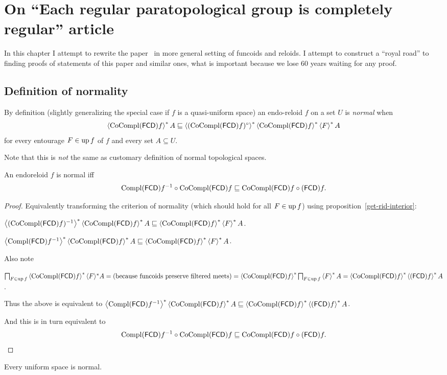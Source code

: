 \chapter{On ``Each regular paratopological group is completely regular'' article}

In this chapter I attempt to rewrite the paper~\cite{2014arXiv1410.1504B} in more general setting of funcoids and reloids.
I attempt to construct a ``royal road'' to finding proofs of statements of this paper and similar ones, what is
important because we lose 60 years waiting for any proof.

\section{Definition of normality}


By definition (slightly generalizing the special case if $f$ is a
quasi-uniform space) an endo-reloid $f$ on a set $U$ is \emph{normal} when
\[ \left\langle \operatorname{CoCompl} (\mathsf{FCD}) f\right\rangle ^{\ast} A \sqsubseteq \left\langle 
(\operatorname{CoCompl} (\mathsf{FCD}) f)^{\circ}\right\rangle ^{\ast} \left\langle \operatorname{CoCompl} (\mathsf{FCD})
f \right\rangle ^{\ast} \left\langle F\right\rangle ^{\ast} A \] for every entourage $F \in
\operatorname{up} f$ of $f$ and every set $A \subseteq U$.

Note that this is \emph{not} the same as customary definition of normal topological spaces.

\begin{thm}
  An endoreloid $f$ is normal iff
  \[ \operatorname{Compl} (\mathsf{FCD}) f^{- 1} \circ \operatorname{CoCompl} (\mathsf{FCD}) f \sqsubseteq
  \operatorname{CoCompl} (\mathsf{FCD}) f \circ (\mathsf{FCD}) f. \]
\end{thm}

\begin{proof}
  Equivalently transforming the criterion of normality (which should hold for
  all $F \in \operatorname{up} f$) using proposition~\ref{get-rid-interior}:

  $\left\langle (\operatorname{CoCompl} (\mathsf{FCD}) f)^{- 1}\right\rangle ^{\ast}
  \left\langle \operatorname{CoCompl} (\mathsf{FCD}) f\right\rangle ^{\ast} A \sqsubseteq
  \left\langle \operatorname{CoCompl} (\mathsf{FCD}) f\right\rangle ^{\ast} \left\langle F\right\rangle ^{\ast} A$.

  $\left\langle \operatorname{Compl} (\mathsf{FCD}) f^{- 1}\right\rangle ^{\ast}
  \left\langle \operatorname{CoCompl} (\mathsf{FCD}) f\right\rangle ^{\ast} A \sqsubseteq
  \left\langle \operatorname{CoCompl} (\mathsf{FCD}) f\right\rangle ^{\ast} \left\langle F\right\rangle ^{\ast} A$.

  Also note
  
  $\bigsqcap_{F \in \operatorname{up} f} \left\langle  \operatorname{CoCompl} (\mathsf{FCD}) f
  \right\rangle ^{\ast} \langle F \rangle^{\ast} A = \text{(because funcoids preserve
  filtered meets)} = \left\langle  \operatorname{CoCompl} (\mathsf{FCD}) f
  \right\rangle ^{\ast}  \bigsqcap_{F \in \operatorname{up} f} \left\langle F\right\rangle ^{\ast} A =
  \left\langle  \operatorname{CoCompl} (\mathsf{FCD}) f \right\rangle ^{\ast}
  \left\langle  (\mathsf{FCD}) f \right\rangle ^{\ast} A$.

  Thus the above is equivalent to
  $\left\langle \operatorname{Compl} (\mathsf{FCD}) f^{- 1}\right\rangle ^{\ast}
  \left\langle \operatorname{CoCompl} (\mathsf{FCD}) f\right\rangle ^{\ast} A \sqsubseteq
  \left\langle  \operatorname{CoCompl} (\mathsf{FCD}) f \right\rangle ^{\ast}
  \left\langle  (\mathsf{FCD}) f \right\rangle ^{\ast} A$.

  And this is in turn equivalent to
  \[ \operatorname{Compl} (\mathsf{FCD}) f^{- 1} \circ \operatorname{CoCompl} (\mathsf{FCD}) f \sqsubseteq
  \operatorname{CoCompl} (\mathsf{FCD}) f \circ (\mathsf{FCD}) f. \]
\end{proof}

\begin{cor}
  Every uniform space is normal.
\end{cor}